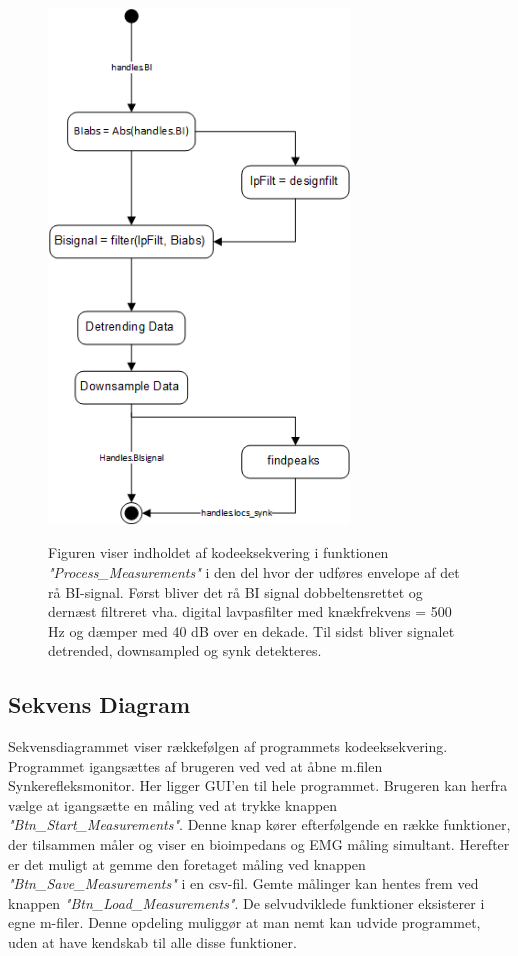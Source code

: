 \begin{figure}[H]
\centering
{\includegraphics[width=8cm]
{Figure/designUML}}
\caption{Figuren viser indholdet af kodeeksekvering i funktionen \textit{"Process\_Measurements"} i den del hvor der udføres envelope af det rå BI-signal. Først bliver det rå BI signal dobbeltensrettet og dernæst filtreret vha. digital lavpasfilter med knækfrekvens = 500 Hz og dæmper med 40 dB over en dekade. Til sidst bliver signalet detrended, downsampled og synk detekteres.}
\label{Fig:designUML}
\end{figure} 








\subsection{Sekvens Diagram}

Sekvensdiagrammet viser rækkefølgen af programmets kodeeksekvering. Programmet igangsættes af brugeren ved ved at åbne m.filen Synkerefleksmonitor. Her ligger GUI'en til hele programmet. Brugeren kan herfra vælge at igangsætte en måling ved at trykke knappen \textit{"Btn\_Start\_Measurements"}. Denne knap kører efterfølgende en række funktioner, der tilsammen måler og viser en bioimpedans og EMG måling simultant. Herefter er det muligt at gemme den foretaget måling ved knappen \textit{"Btn\_Save\_Measurements"} i en csv-fil. Gemte målinger kan hentes frem ved knappen \textit{"Btn\_Load\_Measurements"}.
De selvudviklede funktioner eksisterer i egne m-filer. Denne opdeling muliggør at man nemt kan udvide programmet, uden at have kendskab til alle disse funktioner.    

